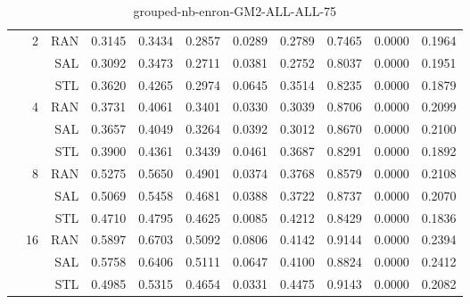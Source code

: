 \begin{center}
\begin{table}[htbp]
\begin{center}
\begin{tabular}{ | r | r | r | r | r | r | r | r | r | r | r |}
 & \multirow{3}{*}{2} & RAN & 0.3145 & 0.3434 & 0.2857 & 0.0289 & 0.2789 & 0.7465 & 0.0000 & 0.1964\\ \cline{3-11}
 &   & SAL & 0.3092 & 0.3473 & 0.2711 & 0.0381 & 0.2752 & 0.8037 & 0.0000 & 0.1951\\ \cline{3-11}
 &   & STL & 0.3620 & 0.4265 & 0.2974 & 0.0645 & 0.3514 & 0.8235 & 0.0000 & 0.1879\\ \cline{2-11}
 & \multirow{3}{*}{4} & RAN & 0.3731 & 0.4061 & 0.3401 & 0.0330 & 0.3039 & 0.8706 & 0.0000 & 0.2099\\ \cline{3-11}
 &   & SAL & 0.3657 & 0.4049 & 0.3264 & 0.0392 & 0.3012 & 0.8670 & 0.0000 & 0.2100\\ \cline{3-11}
 &   & STL & 0.3900 & 0.4361 & 0.3439 & 0.0461 & 0.3687 & 0.8291 & 0.0000 & 0.1892\\ \cline{2-11}
 & \multirow{3}{*}{8} & RAN & 0.5275 & 0.5650 & 0.4901 & 0.0374 & 0.3768 & 0.8579 & 0.0000 & 0.2108\\ \cline{3-11}
 &   & SAL & 0.5069 & 0.5458 & 0.4681 & 0.0388 & 0.3722 & 0.8737 & 0.0000 & 0.2070\\ \cline{3-11}
 &   & STL & 0.4710 & 0.4795 & 0.4625 & 0.0085 & 0.4212 & 0.8429 & 0.0000 & 0.1836\\ \cline{2-11}
 & \multirow{3}{*}{16} & RAN & 0.5897 & 0.6703 & 0.5092 & 0.0806 & 0.4142 & 0.9144 & 0.0000 & 0.2394\\ \cline{3-11}
 &   & SAL & 0.5758 & 0.6406 & 0.5111 & 0.0647 & 0.4100 & 0.8824 & 0.0000 & 0.2412\\ \cline{3-11}
 &   & STL & 0.4985 & 0.5315 & 0.4654 & 0.0331 & 0.4475 & 0.9143 & 0.0000 & 0.2082\\ \cline{2-11}
\hline
\end{tabular}
\caption{grouped-nb-enron-GM2-ALL-ALL-75}
\end{center}
 \end{table}
\end{center}


